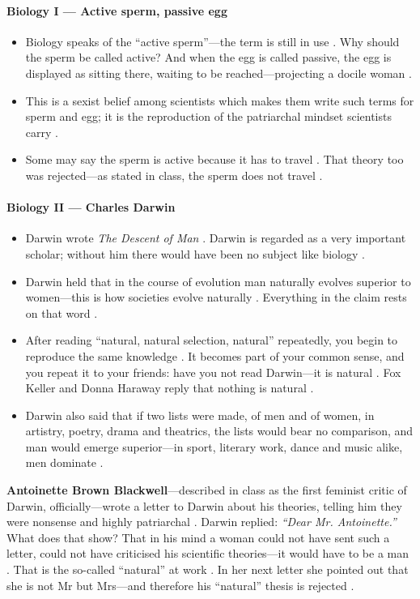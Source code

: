 \paragraph{Biology I --- Active sperm, passive egg}
\begin{itemize}
    \item Biology speaks of the ``active sperm''---the term is still in use . Why should the sperm be called active? And when the egg is called passive, the egg is displayed as sitting there, waiting to be reached---projecting a docile woman .
    \item This is a sexist belief among scientists which makes them write such terms for sperm and egg; it is the reproduction of the patriarchal mindset scientists carry .
    \item Some may say the sperm is active because it has to travel . That theory too was rejected---as stated in class, the sperm does not travel .
\end{itemize}

\paragraph{Biology II --- Charles Darwin}
\begin{itemize}
    \item Darwin wrote \textit{The Descent of Man} . Darwin is regarded as a very important scholar; without him there would have been no subject like biology .
    \item Darwin held that in the course of evolution man naturally evolves superior to women---this is how societies evolve naturally . Everything in the claim rests on that word .
    \item After reading ``natural, natural selection, natural'' repeatedly, you begin to reproduce the same knowledge . It becomes part of your common sense, and you repeat it to your friends: have you not read Darwin---it is natural . Fox Keller and Donna Haraway reply that nothing is natural .
    \item Darwin also said that if two lists were made, of men and of women, in artistry, poetry, drama and theatrics, the lists would bear no comparison, and man would emerge superior---in sport, literary work, dance and music alike, men dominate .
\end{itemize}

\begin{ExampleBox}
\textbf{Antoinette Brown Blackwell}---described in class as the first feminist critic of Darwin, officially---wrote a letter to Darwin about his theories, telling him they were nonsense and highly patriarchal . Darwin replied: \textit{``Dear Mr. Antoinette.''}  What does that show? That in his mind a woman could not have sent such a letter, could not have criticised his scientific theories---it would have to be a man . That is the so-called ``natural'' at work . In her next letter she pointed out that she is not Mr but Mrs---and therefore his ``natural'' thesis is rejected .
\end{ExampleBox}

